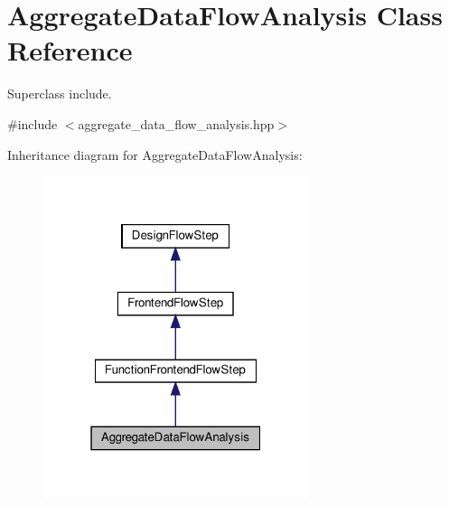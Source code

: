 \hypertarget{classAggregateDataFlowAnalysis}{}\section{Aggregate\+Data\+Flow\+Analysis Class Reference}
\label{classAggregateDataFlowAnalysis}


Superclass include.  




{\ttfamily \#include $<$aggregate\+\_\+data\+\_\+flow\+\_\+analysis.\+hpp$>$}



Inheritance diagram for Aggregate\+Data\+Flow\+Analysis\+:
\nopagebreak
\begin{figure}[H]
\begin{center}
\leavevmode
\includegraphics[width=220pt]{df/d55/classAggregateDataFlowAnalysis__inherit__graph}
\end{center}
\end{figure}


